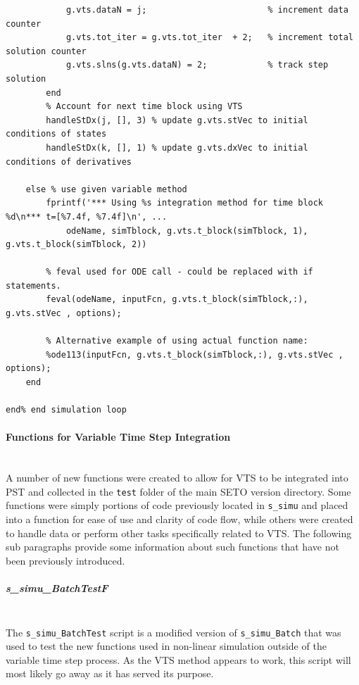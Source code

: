 \documentclass[12pt]{article}
\begin{document}
\begin{verbatim}
            g.vts.dataN = j;                        % increment data counter
            g.vts.tot_iter = g.vts.tot_iter  + 2;   % increment total solution counter
            g.vts.slns(g.vts.dataN) = 2;            % track step solution
        end
        % Account for next time block using VTS
        handleStDx(j, [], 3) % update g.vts.stVec to initial conditions of states
        handleStDx(k, [], 1) % update g.vts.dxVec to initial conditions of derivatives 
        
    else % use given variable method
        fprintf('*** Using %s integration method for time block %d\n*** t=[%7.4f, %7.4f]\n', ...
            odeName, simTblock, g.vts.t_block(simTblock, 1), g.vts.t_block(simTblock, 2))
        
        % feval used for ODE call - could be replaced with if statements.
        feval(odeName, inputFcn, g.vts.t_block(simTblock,:), g.vts.stVec , options);
        
        % Alternative example of using actual function name:
        %ode113(inputFcn, g.vts.t_block(simTblock,:), g.vts.stVec , options);
    end
    
end% end simulation loop
\end{verbatim}

\pagebreak
\paragraph{Functions for Variable Time Step Integration} \ \\
A number of new functions were created to allow for VTS to be integrated into PST and collected in the \verb|test| folder of the main SETO version directory.
Some functions were simply portions of code previously located in \verb|s_simu| and placed into a function for ease of use and clarity of code flow, while others were created to handle data or perform other tasks specifically related to VTS.
The following sub paragraphs provide some information about such functions that have not been previously introduced.



\subparagraph{s\_simu\_BatchTestF} \ \\
The \verb|s_simu_BatchTest| script is a modified version of \verb|s_simu_Batch| that was used to test the new functions used in non-linear simulation outside of the variable time step process.
As the VTS method appears to work, this script will most likely go away as it has served its purpose.
\end{document}
